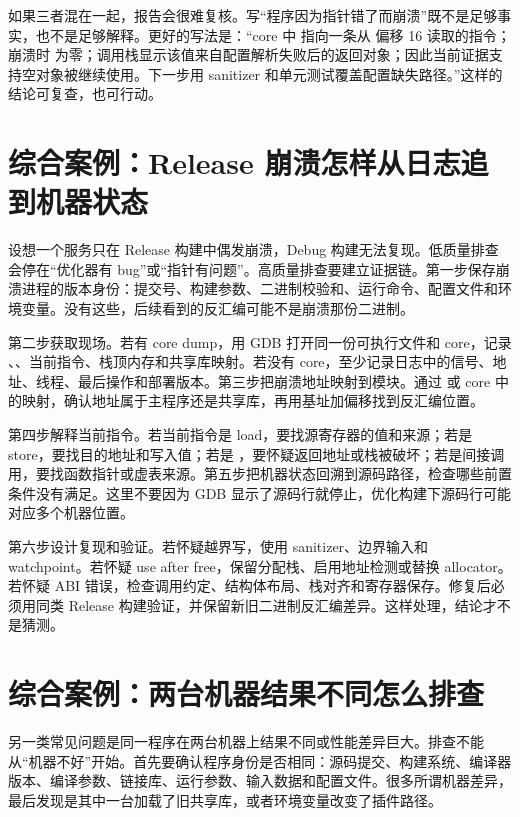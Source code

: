 如果三者混在一起，报告会很难复核。写“程序因为指针错了而崩溃”既不是足够事实，也不是足够解释。更好的写法是：“core 中  指向一条从  偏移 16 读取的指令；崩溃时  为零；调用栈显示该值来自配置解析失败后的返回对象；因此当前证据支持空对象被继续使用。下一步用 sanitizer 和单元测试覆盖配置缺失路径。”这样的结论可复查，也可行动。

\section{综合案例：Release 崩溃怎样从日志追到机器状态}

设想一个服务只在 Release 构建中偶发崩溃，Debug 构建无法复现。低质量排查会停在“优化器有 bug”或“指针有问题”。高质量排查要建立证据链。第一步保存崩溃进程的版本身份：提交号、构建参数、二进制校验和、运行命令、配置文件和环境变量。没有这些，后续看到的反汇编可能不是崩溃那份二进制。

第二步获取现场。若有 core dump，用 GDB 打开同一份可执行文件和 core，记录 、、当前指令、栈顶内存和共享库映射。若没有 core，至少记录日志中的信号、地址、线程、最后操作和部署版本。第三步把崩溃地址映射到模块。通过  或 core 中的映射，确认地址属于主程序还是共享库，再用基址加偏移找到反汇编位置。

第四步解释当前指令。若当前指令是 load，要找源寄存器的值和来源；若是 store，要找目的地址和写入值；若是 ，要怀疑返回地址或栈被破坏；若是间接调用，要找函数指针或虚表来源。第五步把机器状态回溯到源码路径，检查哪些前置条件没有满足。这里不要因为 GDB 显示了源码行就停止，优化构建下源码行可能对应多个机器位置。

第六步设计复现和验证。若怀疑越界写，使用 sanitizer、边界输入和 watchpoint。若怀疑 use after free，保留分配栈、启用地址检测或替换 allocator。若怀疑 ABI 错误，检查调用约定、结构体布局、栈对齐和寄存器保存。修复后必须用同类 Release 构建验证，并保留新旧二进制反汇编差异。这样处理，结论才不是猜测。

\section{综合案例：两台机器结果不同怎么排查}

另一类常见问题是同一程序在两台机器上结果不同或性能差异巨大。排查不能从“机器不好”开始。首先要确认程序身份是否相同：源码提交、构建系统、编译器版本、编译参数、链接库、运行参数、输入数据和配置文件。很多所谓机器差异，最后发现是其中一台加载了旧共享库，或者环境变量改变了插件路径。

